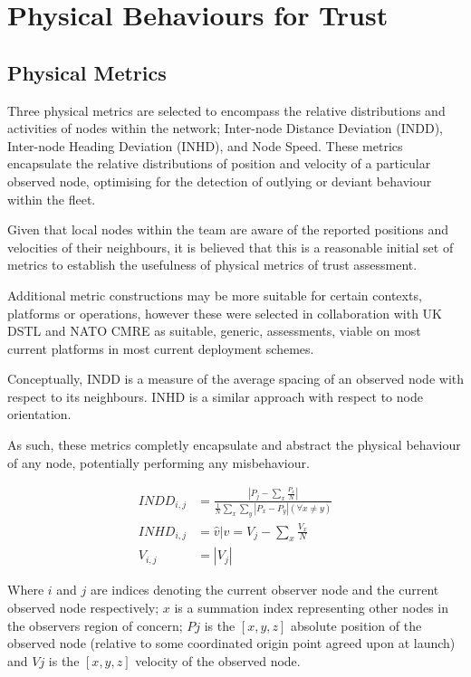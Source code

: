 \documentclass[conference]{IEEEtran}
\begin{document}
\section{Physical Behaviours for Trust}\label{sec:physbev}

\subsection{Physical Metrics}

Three physical metrics are selected to encompass the relative distributions and activities of nodes within the network; Inter-node Distance Deviation (INDD), Inter-node Heading Deviation (INHD), and Node Speed. 
These metrics encapsulate the relative distributions of position and velocity of a particular observed node, optimising for the detection of outlying or deviant behaviour within the fleet.

Given that local nodes within the team are aware of the reported positions and velocities of their neighbours, it is believed that this is a reasonable initial set of metrics to establish the usefulness of physical metrics of trust assessment.

Additional metric constructions may be more suitable for certain contexts, platforms or operations, however these were selected in collaboration with UK DSTL and NATO CMRE as suitable, generic, assessments, viable on most current platforms in most current deployment schemes.

Conceptually, INDD is a measure of the average spacing of an observed node with respect to its neighbours. 
INHD is a similar approach with respect to node orientation.

As such, these metrics completly encapsulate and abstract the physical behaviour of any node, potentially performing any misbehaviour.

\begin{align}
  INDD_{i,j} &= \frac{|P_j - \sum_x \frac{P_x}{N}|}{\frac{1}{N}\sum_x \sum_y{|P_x - P_y| (\forall x \neq y)}}\\
  INHD_{i,j} &= \hat{v} \vert v= V_j - \sum_x{\frac{V_x}{N}}\\
  V_{i,j} &= |V_j|
\end{align}

Where $i$ and $j$ are indices denoting the current observer node and the current observed node respectively; $x$ is a summation index representing other nodes in the observers region of concern; $P{j}$ is the $[x,y,z]$ absolute position of the observed node (relative to some coordinated origin point agreed upon at launch) and $V{j}$ is the $[x,y,z]$ velocity of the observed node.
\end{document}
